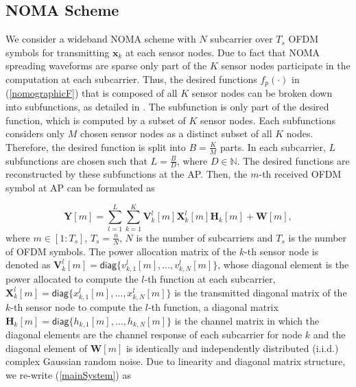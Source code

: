 \documentclass[journal]{IEEEtran}
\theoremstyle{definition}
\begin{document}
\subsection{NOMA Scheme}
We consider a wideband NOMA scheme with $N$ subcarrier over $T_s$ OFDM symbols for transmitting $\mathbf{x}_k$ at each sensor nodes. Due to fact that NOMA spreading waveforms are sparse only part of the $K$ sensor nodes participate in the computation at each subcarrier. Thus, the desired functions $f_p(\cdot)$ in (\ref{nomographicF}) that is composed of all $K$ sensor nodes can be broken down into subfunctions, as detailed in \cite{wu2020noma}. The subfunction is only part of the desired function, which is computed by a subset of $K$ sensor nodes.
Each subfunctions considers only $M$ chosen sensor nodes as a distinct subset of all $K$ nodes. Therefore, the desired function is split into $B = \frac{K}{M}$ parts. In each subcarrier, $L$ subfunctions are chosen such that $L = \frac{B}{D}$, where $D\in \mathbb{N}$. The desired functions are reconstructed by these subfunctions at the AP. Then, the $m$-th received OFDM symbol at AP can be formulated as \cite{wu2020noma}
\iffalse As shown in Fig. \ref{CoMAC01}, the node $i$ draws data from the corresponding random source $S_i$ and obtains a data vector $\mathbf{s}_i$ with length of $T_d$. Then, the node $i$ encodes the data vector $\mathbf{s}_i$ into transmitted vector $\mathbf{x}_i$ with the pre-processing encoding function $g_i(\cdot)$. In this case we can refer encoding $g_i(\cdot)$ as a channel encoder e.g., $\mathbf{x}_i = g_i(\mathbf{s}_i)$ or in case of sensors the encoder $g_i(\cdot) =\{g_{i,t}(\cdot)\}$ for $1\leq t \leq T_d$, e.g., $\mathbf{x}_i = [g_{i,1}(s_{i,1}), \dots, g_{i,T_d}(s_{i,T_d})]^T$. \fi   
\begin{equation}
\label{mainSystem}
\mathbf{Y}[m] = \sum_{l=1}^L \sum_{k =1}^K \mathbf{V}_k^l[m] \mathbf{X}_k^l[m] \mathbf{H}_k[m] +\mathbf{W}[m],
\end{equation}
\noindent where $m \in [1:T_s]$, $T_s = \frac{n}{N}$, $N$ is the number of subcarriers and $T_s$ is the number of OFDM symbols. The power allocation matrix of the $k$-th sensor node is denoted as $\mathbf{V}_k^l[m] = \mathsf{diag}\{ v_{k,1}^l[m], \dots, v_{k,N}^l[m]\}$, whose diagonal element is the power allocated to compute the $l$-th function at each subcarrier, $\mathbf{X}_k^l[m] = \mathsf{diag}\{ x_{k,1}^l[m], \dots, x_{k,N}^l[m]\}$ is the transmitted diagonal matrix of the $k$-th sensor node to compute the $l$-th function, a diagonal matrix $\mathbf{H}_k[m] = \mathsf{diag}\{ h_{k,1}[m], \dots, h_{k,N}[m]\}$ is the channel matrix in which the diagonal elements are the channel response of each subcarrier for node $k$ and the diagonal element of $\mathbf{W}[m]$ is identically and independently distributed (i.i.d.) complex Gaussian random noise. Due to linearity and diagonal matrix structure, we re-write (\ref{mainSystem}) as 
\end{document}
